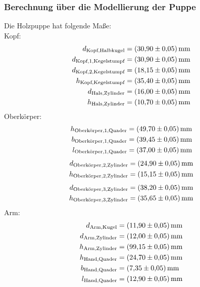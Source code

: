 \subsubsection{Berechnung über die Modellierung der Puppe}
Die Holzpuppe hat folgende Maße:\\
Kopf:\\
\begin{align*}
d_{\text{Kopf,Halbkugel}} &= (\num{30.9 +- 0.05})\,\si{\milli\meter}\\
d_{\text{Kopf,1,Kegelstumpf}} &= (\num{30.9 +- 0.05})\,\si{\milli\meter} \\
d_{\text{Kopf,2,Kegelstumpf}} &= (\num{18.15 +- 0.05})\,\si{\milli\meter} \\
h_{\text{Kopf,Kegelstumpf}} &= (\num{35.4 +- 0.05})\,\si{\milli\meter} \\
d_{\text{Hals,Zylinder}} &= (\num{16 +- 0.05})\,\si{\milli\meter} \\
h_{\text{Hals,Zylinder}} &= (\num{10.7 +- 0.05})\,\si{\milli\meter}
\end{align*}
Oberkörper:\\
\begin{align*}
h_{\text{Oberkörper,1,Quader}} &= (\num{49.7 +- 0.05})\,\si{\milli\meter} \\
b_{\text{Oberkörper,1,Quader}} &= (\num{39.45 +- 0.05})\,\si{\milli\meter} \\
l_{\text{Oberkörper,1,Quader}} &= (\num{37 +- 0.05})\,\si{\milli\meter}
\end{align*}
\begin{align*}
d_{\text{Oberkörper,2,Zylinder}} &= (\num{24.9 +- 0.05})\,\si{\milli\meter} \\
h_{\text{Oberkörper,2,Zylinder}} &= (\num{15.15 +- 0.05})\,\si{\milli\meter}
\end{align*}
\begin{align*}
d_{\text{Oberkörper,3,Zylinder}} &= (\num{38.2 +- 0.05})\,\si{\milli\meter} \\
h_{\text{Oberkörper,3,Zylinder}} &= (\num{35.65 +- 0.05})\,\si{\milli\meter}
\end{align*}
Arm:\\
\begin{align*}
d_{\text{Arm,Kugel}} &= (\num{11.9 +- 0.05})\,\si{\milli\meter} \\
d_{\text{Arm,Zylinder}} &= (\num{12 +- 0.05})\,\si{\milli\meter} \\
h_{\text{Arm,Zylinder}} &= (\num{99.15 +- 0.05})\,\si{\milli\meter} \\
h_{\text{Hand,Quader}} &= (\num{24.7 +- 0.05})\,\si{\milli\meter} \\
b_{\text{Hand,Quader}} &= (\num{7.35 +- 0.05})\,\si{\milli\meter} \\
l_{\text{Hand,Quader}} &= (\num{12.9 +- 0.05})\,\si{\milli\meter}
\end{align*}

